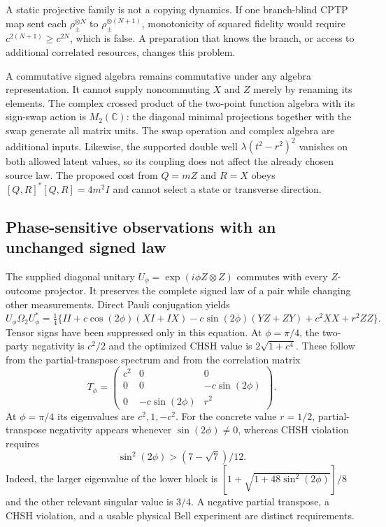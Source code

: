 A static projective family is not a copying dynamics. If one branch-blind CPTP map sent each $\rho_\pm^{\otimes N}$ to $\rho_\pm^{\otimes(N+1)}$, monotonicity of squared fidelity would require $c^{2(N+1)}\ge c^{2N}$, which is false. A preparation that knows the branch, or access to additional correlated resources, changes this problem.

A commutative signed algebra remains commutative under any algebra representation. It cannot supply noncommuting $X$ and $Z$ merely by renaming its elements. The complex crossed product of the two-point function algebra with its sign-swap action is $M_2(\mathbb C)$: the diagonal minimal projections together with the swap generate all matrix units. The swap operation and complex algebra are additional inputs. Likewise, the supported double well $\lambda(t^2-r^2)^2$ vanishes on both allowed latent values, so its coupling does not affect the already chosen source law. The proposed cost from $Q=mZ$ and $R=X$ obeys $[Q,R]^*[Q,R]=4m^2I$ and cannot select a state or transverse direction.

\subsection{Phase-sensitive observations with an unchanged signed law}
\label{qua:phase}
The supplied diagonal unitary $U_\phi=\exp(i\phi Z\otimes Z)$ commutes with every $Z$-outcome projector. It preserves the complete signed law of a pair while changing other measurements. Direct Pauli conjugation yields
\begin{equation}
 U_\phi\Omega_2U_\phi^*=\tfrac14\{II+c\cos(2\phi)(XI+IX)
 -c\sin(2\phi)(YZ+ZY)+c^2XX+r^2ZZ\}.
 \label{qua:phaseform}
\end{equation}
Tensor signs have been suppressed only in this equation. At $\phi=\pi/4$, the two-party negativity is $c^2/2$ and the optimized CHSH value is $2\sqrt{1+c^4}$. These follow from the partial-transpose spectrum and from the correlation matrix
\[
 T_\phi=\begin{pmatrix}c^2&0&0\\0&0&-c\sin(2\phi)\\0&-c\sin(2\phi)&r^2\end{pmatrix}.
\]
At $\phi=\pi/4$ its eigenvalues are $c^2,1,-c^2$.
For the concrete value $r=1/2$, partial-transpose negativity appears whenever $\sin(2\phi)\ne0$, whereas CHSH violation requires
\[
 \sin^2(2\phi)>(7-\sqrt7)/12.
\]
Indeed, the larger eigenvalue of the lower block is
$[1+\sqrt{1+48\sin^2(2\phi)}]/8$ and the other relevant singular value is $3/4$. A negative partial transpose, a CHSH violation, and a usable physical Bell experiment are distinct requirements.

